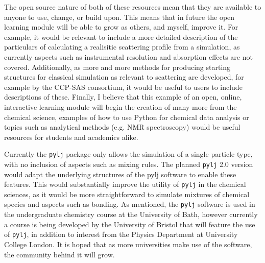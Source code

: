 The open source nature of both of these resources mean that they are available to anyone to use, change, or build upon.
This means that in future the open learning module will be able to grow as others, and myself, improve it.
For example, it would be relevant to include a more detailed description of the particulars of calculating a realisitic scattering profile from a simulation, as currently aspects such as instrumental resolution and absorption effects are not covered.
Additionally, as more and more methods for producing starting structures for classical simulation as relevant to scattering are developed, for example by the CCP-SAS consortium, it would be useful to users to include descriptions of these.
Finally, I believe that this example of an open, online, interactive learning module will begin the creation of many more from the chemical science, examples of how to use Python for chemical data analysis or topics such as analytical methods (e.g. NMR spectroscopy) would be useful resources for students and academics alike.

Currently the \texttt{pylj} package only allows the simulation of a single particle type, with no inclusion of aspects such as mixing rules.
The planned \texttt{pylj} 2.0 version would adapt the underlying structures of the pylj software to enable these features.
This would substantially improve the utility of \texttt{pylj} in the chemical sciences, as it would be more straightforward to simulate mixtures of chemical species and aspects such as bonding.
As mentioned, the \texttt{pylj} software is used in the undergraduate chemistry course at the University of Bath, however currently a course is being developed by the University of Bristol that will feature the use of \texttt{pylj}, in addition to interest from the Physics Department at University College London.
It is hoped that as more universities make use of the software, the community behind it will grow.


\renewcommand\bibsection{\section{\refname}}


